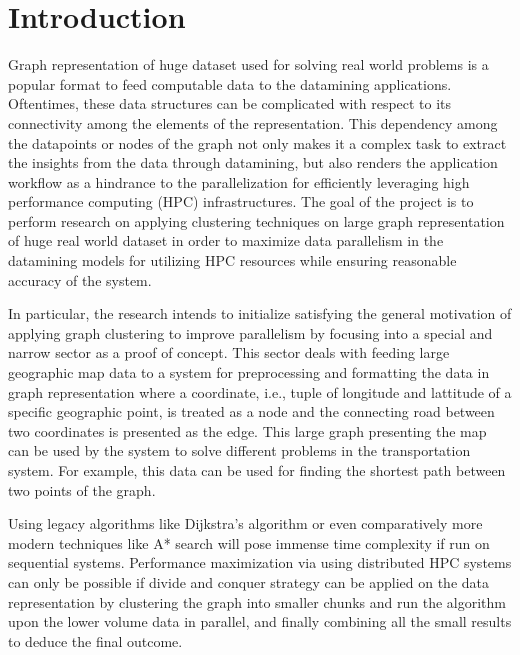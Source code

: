 \section{Introduction}
\label{sec:introduction}

Graph representation of huge dataset used for solving real world problems
is a popular format to feed computable data to the datamining applications.
Oftentimes, these data structures can be complicated with respect to its
connectivity among the elements of the representation. This dependency
among the datapoints or nodes of the graph not only makes it a complex task
to extract the insights from the data through datamining, but also renders
the application workflow as a hindrance to the parallelization for
efficiently leveraging high performance computing (HPC) infrastructures.
The goal of the project is to perform research on applying clustering
techniques on large graph representation of huge real world dataset
in order to maximize data parallelism in the datamining models for
utilizing HPC resources while ensuring reasonable accuracy of the system.

In particular, the research intends to initialize satisfying the general
motivation of applying graph clustering to improve parallelism
by focusing into a special and narrow sector as a proof of concept.
This sector deals with feeding large geographic map data to a system
for preprocessing and formatting the data in graph representation
where a coordinate, i.e., tuple of longitude and lattitude of
a specific geographic point, is treated as a node and the connecting
road between two coordinates is presented as the edge.
This large graph presenting the map can be used by the system to
solve different problems in the transportation system. For example,
this data can be used for finding the shortest path between two points of the graph.

Using legacy algorithms like Dijkstra's algorithm or even comparatively
more modern techniques like A* search will pose
immense time complexity if run on sequential systems.
Performance maximization via using distributed HPC systems can only be possible
if divide and conquer strategy can be applied on the data representation
by clustering the graph into smaller chunks and run the algorithm
upon the lower volume data in parallel, and finally combining
all the small results to deduce the final outcome.

